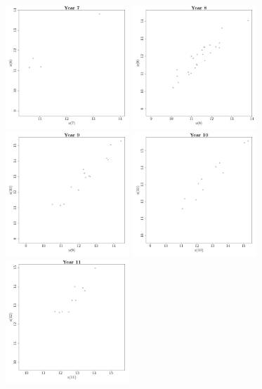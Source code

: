 \documentclass{article}\usepackage[]{graphicx}\usepackage[]{color}
\newenvironment{knitrout}{}{} %
\begin{document}
\begin{knitrout}
\includegraphics[width=0.35\textwidth]{figure/Reshaping7} 
\includegraphics[width=0.35\textwidth]{figure/Reshaping8} 
\includegraphics[width=0.35\textwidth]{figure/Reshaping9} 
\includegraphics[width=0.35\textwidth]{figure/Reshaping10} 
\includegraphics[width=0.35\textwidth]{figure/Reshaping11} 

\end{knitrout}
\end{document}
